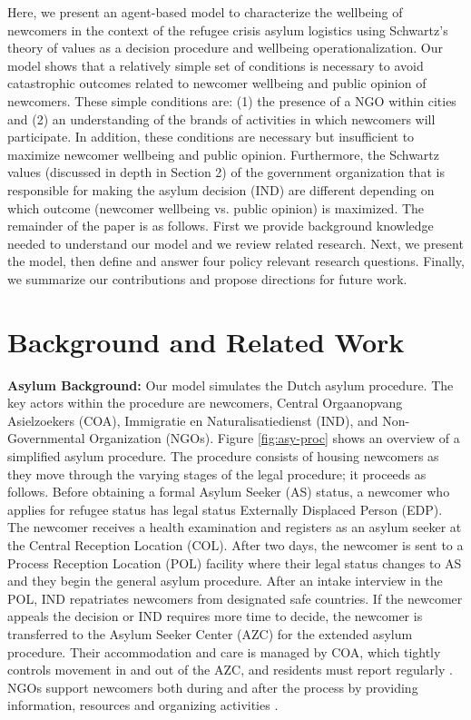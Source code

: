 \documentclass{scspaperproc}
\theoremstyle{scsthe}
\begin{document}

Here, we present an agent-based model to characterize the wellbeing of newcomers in the context of the refugee crisis asylum logistics using Schwartz's theory of values as a decision procedure and wellbeing operationalization. Our model shows that a relatively simple set of conditions is necessary to avoid catastrophic outcomes related to newcomer wellbeing and public opinion of newcomers. These simple conditions are: (1) the presence of a NGO within cities and (2) an understanding of the brands of activities in which newcomers will participate. In addition, these conditions are necessary but insufficient to maximize newcomer wellbeing and public opinion. Furthermore, the Schwartz values (discussed in depth in Section 2) of the government organization that is responsible for making the asylum decision (IND) are different depending on which outcome (newcomer wellbeing vs. public opinion) is maximized. The remainder of the paper is as follows. First we provide background knowledge needed to understand our model and we review related research. Next, we present the model, then define and answer four policy relevant research questions. Finally, we summarize our contributions and propose directions for future work.

\section{Background and Related Work}
\label{sec:value-background}
{\bf Asylum Background:} Our model simulates the Dutch asylum procedure. The key actors within the procedure are newcomers, Central Orgaanopvang Asielzoekers (COA), Immigratie en Naturalisatiedienst (IND), and Non-Governmental Organization (NGOs). Figure \ref{fig:asy-proc} shows an overview of a simplified asylum procedure. The procedure consists of housing newcomers as they move through the varying stages of the legal procedure; it proceeds as follows. Before obtaining a formal Asylum Seeker (AS) status, a newcomer who applies for refugee status has legal status Externally Displaced Person (EDP). The newcomer receives a health examination and registers as an asylum seeker at the Central Reception Location (COL). After two days, the newcomer is sent to a Process Reception Location (POL) facility where their legal status changes to AS and they begin the general asylum procedure. After an intake interview in the POL, IND repatriates newcomers from designated safe countries. If the newcomer appeals the decision or IND requires more time to decide, the newcomer is transferred to the Asylum Seeker Center (AZC) for the extended asylum procedure. Their accommodation and care is managed by COA, which tightly controls movement in and out of the AZC, and residents must report regularly \cite{9}. NGOs support newcomers both during and after the process by providing information, resources and organizing activities \cite{94}.
\end{document}
